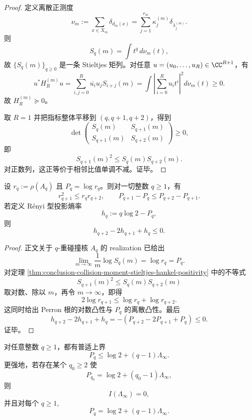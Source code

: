 \begin{proof}
定义离散正测度
\[
\nu_m:=\sum_{x\in X_m}\delta_{d_m(x)}
=\sum_{j=1}^{r_m}\kappa_j^{(m)}\delta_{\lambda_j^{(m)}}.
\]
则
\[
S_q(m)=\int t^q\,d\nu_m(t),
\]
故 \(\{S_q(m)\}_{q\ge 0}\) 是一条 Stieltjes 矩列。对任意 \(u=(u_0,\dots,u_R)\in\CC^{R+1}\)，有
\[
u^\ast H_R^{(m)}u
=
\sum_{i,j=0}^{R}\overline{u_i}u_jS_{i+j}(m)
=
\int\left|\sum_{i=0}^{R}u_it^i\right|^2d\nu_m(t)\ge 0.
\]
故 \(H_R^{(m)}\succeq 0\)。

取 \(R=1\) 并把指标整体平移到 \((q,q+1,q+2)\)，得到
\[
\det
\begin{pmatrix}
S_q(m) & S_{q+1}(m)\\
S_{q+1}(m) & S_{q+2}(m)
\end{pmatrix}
\ge 0,
\]
即
\[
S_{q+1}(m)^2\le S_q(m)S_{q+2}(m).
\]
对正数列，这正等价于相邻比值单调不减。证毕。
\end{proof}

\begin{corollary}\label{cor:conclusion-collision-perron-logconvex-renyi-concavity}
设 \(r_q:=\rho(A_q)\) 且 \(P_q=\log r_q\)。则对一切整数 \(q\ge 1\)，有
\[
r_{q+1}^2\le r_qr_{q+2},
\qquad
P_{q+1}-P_q\le P_{q+2}-P_{q+1}.
\]
若定义 Rényi 型投影熵率
\[
h_q:=q\log 2-P_q,
\]
则
\[
h_{q+2}-2h_{q+1}+h_q\le 0.
\]
\end{corollary}

\begin{proof}
正文关于 \(q\)-重碰撞核 \(A_q\) 的 realization 已给出
\[
\lim_{m\to\infty}\frac{1}{m}\log S_q(m)=\log r_q=P_q.
\]
对定理 \ref{thm:conclusion-collision-moment-stieltjes-hankel-positivity} 中的不等式
\[
S_{q+1}(m)^2\le S_q(m)S_{q+2}(m)
\]
取对数、除以 \(m\)，再令 \(m\to\infty\)，即得
\[
2\log r_{q+1}\le \log r_q+\log r_{q+2}.
\]
这同时给出 Perron 根的对数凸性与 \(P_q\) 的离散凸性。最后
\[
h_{q+2}-2h_{q+1}+h_q
=
-(P_{q+2}-2P_{q+1}+P_q)\le 0.
\]
证毕。
\end{proof}

\begin{theorem}[单一有限阶饱和强制整个正阶压力射线线性冻结]\label{thm:conclusion-one-order-saturation-freezes-pressure-ray}
对任意整数 \(q\ge 1\)，都有普适上界
\[
P_q\le \log 2+(q-1)\Lambda_\infty.
\]
更强地，若存在某个 \(q_0\ge 2\) 使
\[
P_{q_0}=\log 2+(q_0-1)\Lambda_\infty,
\]
则
\[
I(\Lambda_\infty)=0,
\]
并且对每个 \(q\ge 1\),
\[
P_q=\log 2+(q-1)\Lambda_\infty.
\]
\end{theorem}


